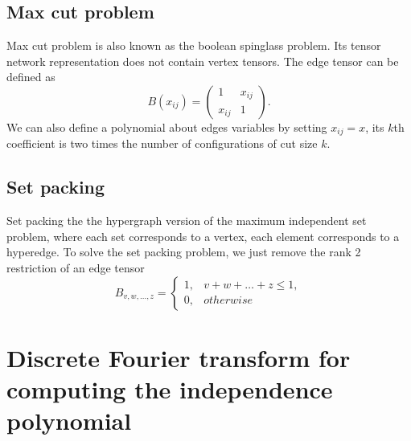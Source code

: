 \documentclass[onefignum, onetabnum]{siamart190516}
\newcommand{\<}{\langle}
\renewcommand{\>}{\rangle}
\begin{document}
\subsection{Max cut problem}
Max cut problem is also known as the boolean spinglass problem.
Its tensor network representation does not contain vertex tensors.
The edge tensor can be defined as
\begin{equation}
    B(x_{ij}) = \left(\begin{matrix}
        1 & x_{ij}\\
        x_{ij} & 1
    \end{matrix}\right).
\end{equation}
We can also define a polynomial about edges variables by setting $x_{ij} = x$,
its $k$th coefficient is two times the number of configurations of cut size $k$.

\subsection{Set packing}
Set packing the the hypergraph version of the maximum independent set problem, where each set corresponds to a vertex, each element corresponds to a hyperedge.
To solve the set packing problem, we just remove the rank 2 restriction of an edge tensor
\begin{equation}
    B_{v,w,\ldots, z} = \begin{cases}
        1, & v+w+\ldots+z\leq 1,\\
        0, & otherwise
    \end{cases}
\end{equation}

\section{Discrete Fourier transform for computing the independence polynomial}\label{app:fft}
\end{document}
